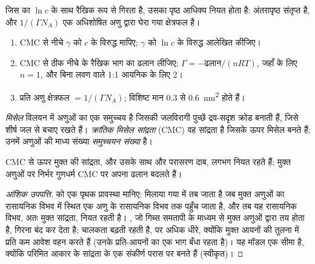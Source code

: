 जिस  का  $\ln c$ के साथ रैखिक रूप से गिरता है, उसका पृष्ठ आधिक्य
नियत होता है: अंतरापृष्ठ संतृप्त है, और $1/(\Gamma N_A)$ एक अधिशोषित अणु द्वारा
घेरा गया क्षेत्रफल है।

\begin{method}\label{met:b3:colloids:surface-excess}
\begin{enumerate}
  \item CMC से नीचे $\gamma$ को $c$ के विरुद्ध मापिए; $\gamma$ को $\ln c$ के विरुद्ध आलेखित कीजिए।
  \item CMC से ठीक नीचे के रैखिक भाग का ढलान लीजिए; $\Gamma = -\text{ढलान}/(nRT)$, जहाँ  के लिए $n
        = 1$, और बिना लवण वाले 1:1 आयनिक के लिए 2।
  \item प्रति अणु क्षेत्रफल $= 1/(\Gamma N_A)$; विशिष्ट मान 0.3 से \qty{0.6}{nm^2} होते हैं।
\end{enumerate}
\end{method}

\begin{definition}[मिसेल, क्रांतिक मिसेल सांद्रता, समुच्चयन संख्या]\label{def:b3:colloids:micelle}
\emph{मिसेल} विलयन में  अणुओं का एक समुच्चय है
जिसकी जलविरागी पुच्छें द्रव-सदृश क्रोड बनाती हैं, जिसे शीर्ष जल से
बचाए रखते हैं। \emph{क्रांतिक मिसेल सांद्रता}
(CMC) वह सांद्रता है जिसके ऊपर मिसेल बनते हैं; उनमें अणुओं की
माध्य संख्या \emph{समुच्चयन संख्या} है।
\end{definition}

\begin{proposition}[CMC पर विराम]\label{prop:b3:colloids:cmc-break}
CMC से ऊपर मुक्त  की सांद्रता, और उसके साथ  और परासरण दाब, लगभग नियत रहते हैं; मुक्त अणुओं पर निर्भर
गुणधर्म CMC पर अपना ढलान बदलते हैं।
\end{proposition}

\begin{proof}[आंशिक उपपत्ति]
 को एक पृथक प्रावस्था मानिए: मिलाया गया   में तब जाता है जब
मुक्त अणुओं का रासायनिक विभव  में स्थित एक अणु के रासायनिक विभव तक पहुँच जाता है,
और तब यह रासायनिक विभव, अतः मुक्त सांद्रता, नियत
रहती है। , जो गिब्स समतापी के माध्यम से मुक्त अणुओं द्वारा तय होता है, गिरना
बंद कर देता है; चालकता बढ़ती रहती है, पर अधिक धीरे, क्योंकि
 मुक्त आयनों की तुलना में प्रति  कम आवेश वहन करते हैं (उनके प्रति-आयनों का
एक भाग बँधा रहता है)। यह मॉडल एक सीमा है, क्योंकि परिमित आकार के 
सांद्रता के एक संकीर्ण परास पर बनते हैं (स्वीकृत)।
\end{proof}

